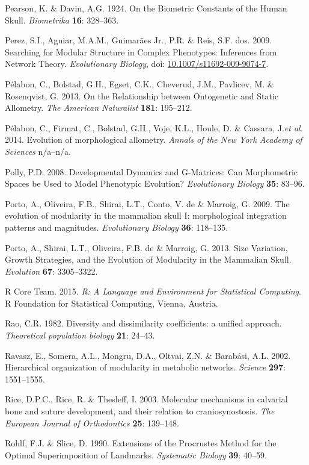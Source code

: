 \documentclass[12pt,twoside]{report}
\begin{document}
Pearson, K. \& Davin, A.G. 1924. On the Biometric Constants of the Human
Skull. \emph{Biometrika} \textbf{16}: 328--363.

Perez, S.I., Aguiar, M.A.M., Guimarães Jr., P.R. \& Reis, S.F. dos.
2009. Searching for Modular Structure in Complex Phenotypes: Inferences
from Network Theory. \emph{Evolutionary Biology}, doi:
\href{http://dx.doi.org/10.1007/s11692-009-9074-7}{10.1007/s11692-009-9074-7}.

Pélabon, C., Bolstad, G.H., Egset, C.K., Cheverud, J.M., Pavlicev, M. \&
Rosenqvist, G. 2013. On the Relationship between Ontogenetic and Static
Allometry. \emph{The American Naturalist} \textbf{181}: 195--212.

Pélabon, C., Firmat, C., Bolstad, G.H., Voje, K.L., Houle, D. \&
Cassara, J.\emph{et al.} 2014. Evolution of morphological allometry.
\emph{Annals of the New York Academy of Sciences} n/a--n/a.

Polly, P.D. 2008. Developmental Dynamics and G-Matrices: Can
Morphometric Spaces be Used to Model Phenotypic Evolution?
\emph{Evolutionary Biology} \textbf{35}: 83--96.

Porto, A., Oliveira, F.B., Shirai, L.T., Conto, V. de \& Marroig, G.
2009. The evolution of modularity in the mammalian skull I:
morphological integration patterns and magnitudes. \emph{Evolutionary
Biology} \textbf{36}: 118--135.

Porto, A., Shirai, L.T., Oliveira, F.B. de \& Marroig, G. 2013. Size
Variation, Growth Strategies, and the Evolution of Modularity in the
Mammalian Skull. \emph{Evolution} \textbf{67}: 3305--3322.

R Core Team. 2015. \emph{R: A Language and Environment for Statistical
Computing}. R Foundation for Statistical Computing, Vienna, Austria.

Rao, C.R. 1982. Diversity and dissimilarity coefficients: a unified
approach. \emph{Theoretical population biology} \textbf{21}: 24--43.

Ravasz, E., Somera, A.L., Mongru, D.A., Oltvai, Z.N. \& Barabási, A.L.
2002. Hierarchical organization of modularity in metabolic networks.
\emph{Science} \textbf{297}: 1551--1555.

Rice, D.P.C., Rice, R. \& Thesleff, I. 2003. Molecular mechanisms in
calvarial bone and suture development, and their relation to
craniosynostosis. \emph{The European Journal of Orthodontics}
\textbf{25}: 139--148.

Rohlf, F.J. \& Slice, D. 1990. Extensions of the Procrustes Method for
the Optimal Superimposition of Landmarks. \emph{Systematic Biology}
\textbf{39}: 40--59.
\end{document}
